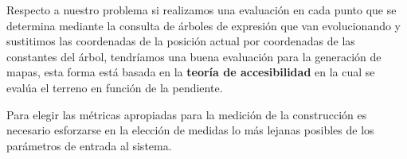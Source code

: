 Respecto a nuestro problema si realizamos una evaluación en cada punto que se determina mediante la consulta de árboles de expresión  que van evolucionando y sustitimos las coordenadas de la posición actual por coordenadas de las constantes del árbol, tendríamos una buena evaluación para la generación de mapas, esta forma está basada en la {\bf teoría de accesibilidad} en la cual se evalúa el terreno en función de la pendiente.

Para elegir las métricas apropiadas para la medición de la construcción es necesario esforzarse en la elección de medidas lo más lejanas posibles de los parámetros de entrada al sistema.





